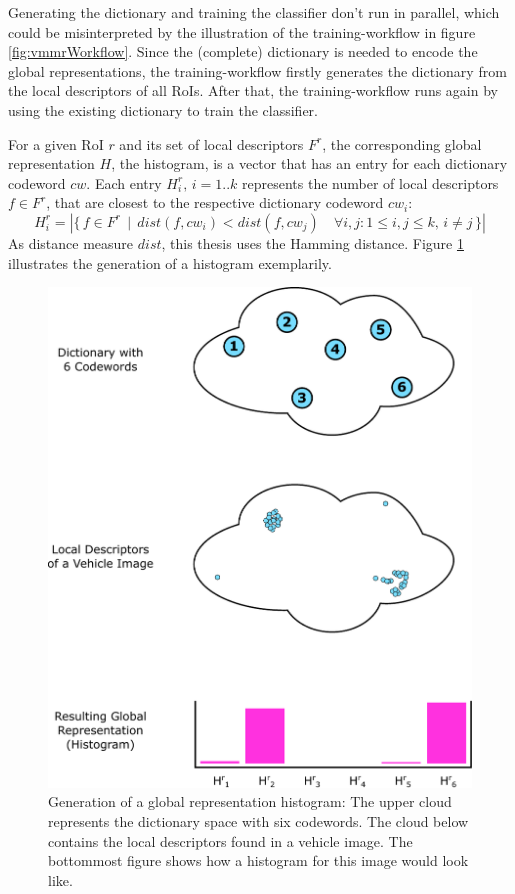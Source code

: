 Generating the dictionary and training the classifier don't run in parallel, which could be misinterpreted by the illustration of the training-workflow in figure \ref{fig:vmmrWorkflow}. Since the (complete) dictionary is needed to encode the global representations, the training-workflow firstly generates the dictionary from the local descriptors of all RoIs. After that, the training-workflow runs again by using the existing dictionary to train the classifier.

For a given RoI $r$ and its set of local descriptors $F^r$, the corresponding global representation $H$, the histogram, is a vector that has an entry for each dictionary codeword $cw$. Each entry $H_i^r,\,i = 1..k$ represents the number of local descriptors $f \in F^r$, that are closest to the respective dictionary codeword $cw_i$:
\begin{equation}
H_i^r = |\{\, f \in F^r \,\mid\, dist(f, cw_i) < dist(f, cw_j) \quad \forall i, j: 1 \le i, j \le k,\, i \ne j \,\}|
\end{equation}
As distance measure $dist$, this thesis uses the Hamming distance. Figure \ref{fig:histogram} illustrates the generation of a histogram exemplarily.

\begin{figure}[btph]
  \centering
        \includegraphics[width=.54\linewidth]{gfx/histogram}
        \caption{Generation of a global representation histogram: The upper cloud represents the dictionary space with six codewords. The cloud below contains the local descriptors found in a vehicle image. The bottommost figure shows how a histogram for this image would look like.}
        \label{fig:histogram}
\end{figure}

